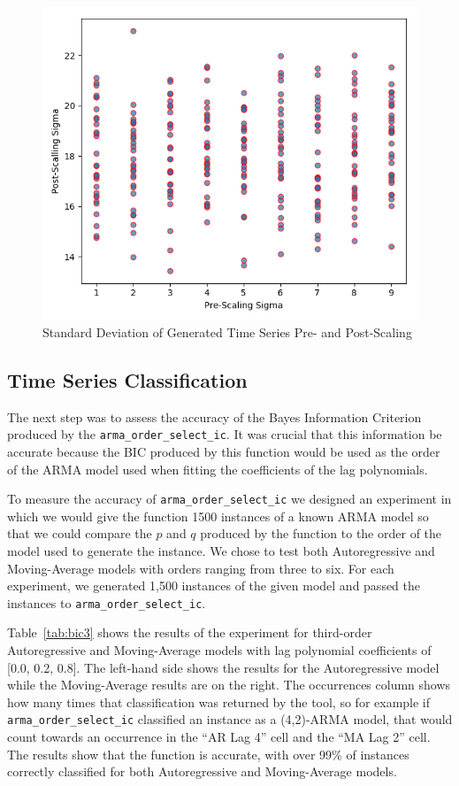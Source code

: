 \documentclass[oneside,12pt,openany]{book}
\begin{document}
    \begin{figure}[hbt!]
        \centering
        \includegraphics[width=.8\linewidth]{images/SigmaOfSeries-PostScaling.png}
        \caption{Standard Deviation of Generated Time Series Pre- and Post-Scaling}
        \label{fig:sigmaofseries-post}
    \end{figure}
    
    \subsection{Time Series Classification}
    
    The next step was to assess the accuracy of the Bayes Information Criterion produced by the \texttt{arma\_order\_select\_ic}. It was crucial that this information be accurate because the BIC produced by this function would be used as the order of the ARMA model used when fitting the coefficients of the lag polynomials. 
    
    To measure the accuracy of \texttt{arma\_order\_select\_ic} we designed an experiment in which we would give the function 1500 instances of a known ARMA model so that we could compare the $p$ and $q$ produced by the function to the order of the model used to generate the instance. We chose to test both Autoregressive and Moving-Average models with orders ranging from three to six. For each experiment, we generated 1,500 instances of the given model and passed the instances to \texttt{arma\_order\_select\_ic}. 
    
    Table~\ref{tab:bic3} shows the results of the experiment for third-order Autoregressive and Moving-Average models with lag polynomial coefficients of [0.0, 0.2, 0.8]. The left-hand side shows the results for the Autoregressive model while the Moving-Average results are on the right. The occurrences column shows how many times that classification was returned by the tool, so for example if \texttt{arma\_order\_select\_ic} classified an instance as a (4,2)-ARMA model, that would count towards an occurrence in the ``AR Lag 4'' cell and the ``MA Lag 2'' cell. The results show that the function is accurate, with over 99\% of instances correctly classified for both Autoregressive and Moving-Average models.
    
\end{document}
